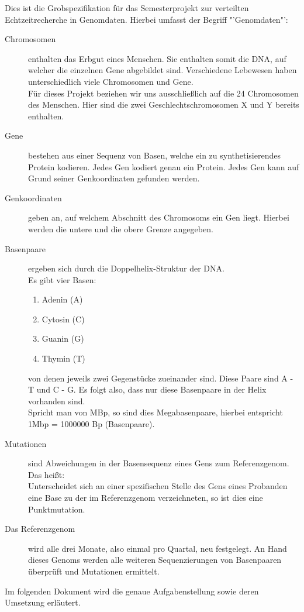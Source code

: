 \documentclass{scrartcl}
\begin{document}
Dies ist die Grobspezifikation für das Semesterprojekt zur verteilten Echtzeitrecherche in Genomdaten. 
Hierbei umfasst der Begriff "'Genomdaten"':
\begin{description}
\item[Chromosomen] enthalten das Erbgut eines Menschen. Sie enthalten somit die DNA, auf welcher die einzelnen Gene abgebildet sind. Verschiedene Lebewesen haben unterschiedlich viele Chromosomen und Gene. 
\\ Für dieses Projekt beziehen wir uns ausschließlich auf die 24 Chromosomen des Menschen. Hier sind die zwei Geschlechtschromosomen X und Y bereits enthalten.

\item[Gene] bestehen aus einer Sequenz von Basen, welche ein zu synthetisierendes Protein kodieren. Jedes Gen kodiert genau ein Protein. Jedes Gen kann auf Grund seiner Genkoordinaten gefunden werden.

\item[Genkoordinaten] geben an, auf welchem Abschnitt des Chromosoms ein Gen liegt.
Hierbei werden die untere und die obere Grenze angegeben.

\item[Basenpaare] ergeben sich durch die Doppelhelix-Struktur der DNA.\\ Es gibt vier Basen:
\begin{enumerate}
\item Adenin (A) 
\item Cytosin (C)
\item Guanin (G)
\item Thymin (T)
\end{enumerate}
 von denen jeweils zwei Gegenstücke zueinander sind. Diese Paare sind A - T und C - G. Es folgt also, dass nur diese Basenpaare in der Helix vorhanden sind.\\
Spricht man von MBp, so sind dies Megabasenpaare, hierbei entspricht\\
1Mbp = 1000000 Bp (Basenpaare).

\item[Mutationen] sind Abweichungen in der Basensequenz eines Gens zum Referenzgenom. Das heißt:\\Unterscheidet sich an einer spezifischen Stelle des Gens eines Probanden eine Base zu der im Referenzgenom verzeichneten, so ist dies eine Punktmutation.

\item[Das Referenzgenom] wird alle drei Monate, also einmal pro Quartal, neu festgelegt. An Hand dieses Genoms werden alle weiteren Sequenzierungen von Basenpaaren überprüft und Mutationen ermittelt. 
\end{description}
Im folgenden Dokument wird die genaue Aufgabenstellung sowie deren Umsetzung erläutert.
\end{document}

